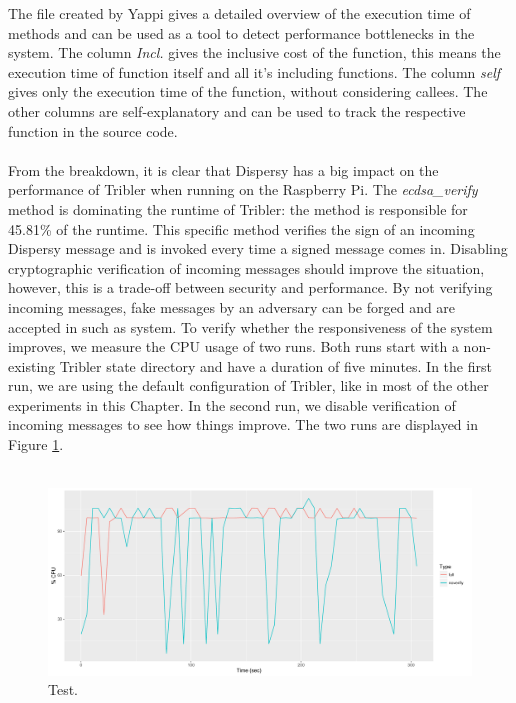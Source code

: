 The file created by Yappi gives a detailed overview of the execution time of methods and can be used as a tool to detect performance bottlenecks in the system. The column \emph{Incl.} gives the inclusive cost of the function, this means the execution time of function itself and all it's including functions. The column \emph{self} gives only the execution time of the function, without considering callees. The other columns are self-explanatory and can be used to track the respective function in the source code.\\\\
From the breakdown, it is clear that Dispersy has a big impact on the performance of Tribler when running on the Raspberry Pi. The \emph{ecdsa\_verify} method is dominating the runtime of Tribler: the method is responsible for 45.81\% of the runtime. This specific method verifies the sign of an incoming Dispersy message and is invoked every time a signed message comes in. Disabling cryptographic verification of incoming messages should improve the situation, however, this is a trade-off between security and performance. By not verifying incoming messages, fake messages by an adversary can be forged and are accepted in such as system. To verify whether the responsiveness of the system improves, we measure the CPU usage of two runs. Both runs start with a non-existing Tribler state directory and have a duration of five minutes. In the first run, we are using the default configuration of Tribler, like in most of the other experiments in this Chapter. In the second run, we disable verification of incoming messages to see how things improve. The two runs are displayed in Figure \ref{fig:raspi_cpu_usage}.\\\\

\begin{figure}[!h]
	\centering
	\includegraphics[width=1.0\columnwidth]{images/experiments/raspi_cpu_usage}
	\caption{Test.}
	\label{fig:raspi_cpu_usage}
\end{figure}

